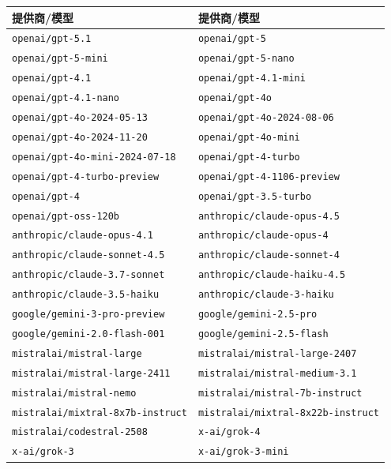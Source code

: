 \begin{table}[t]
\centering
\footnotesize
\begin{tabular}{ll}
\toprule
\textbf{提供商/模型} & \textbf{提供商/模型} \\
\midrule
\texttt{openai/gpt-5.1} & \texttt{openai/gpt-5} \\
\texttt{openai/gpt-5-mini} & \texttt{openai/gpt-5-nano} \\
\texttt{openai/gpt-4.1} & \texttt{openai/gpt-4.1-mini} \\
\texttt{openai/gpt-4.1-nano} & \texttt{openai/gpt-4o} \\
\texttt{openai/gpt-4o-2024-05-13} & \texttt{openai/gpt-4o-2024-08-06} \\
\texttt{openai/gpt-4o-2024-11-20} & \texttt{openai/gpt-4o-mini} \\
\texttt{openai/gpt-4o-mini-2024-07-18} & \texttt{openai/gpt-4-turbo} \\
\texttt{openai/gpt-4-turbo-preview} & \texttt{openai/gpt-4-1106-preview} \\
\texttt{openai/gpt-4} & \texttt{openai/gpt-3.5-turbo} \\
\texttt{openai/gpt-oss-120b} & \texttt{anthropic/claude-opus-4.5} \\
\texttt{anthropic/claude-opus-4.1} & \texttt{anthropic/claude-opus-4} \\
\texttt{anthropic/claude-sonnet-4.5} & \texttt{anthropic/claude-sonnet-4} \\
\texttt{anthropic/claude-3.7-sonnet} & \texttt{anthropic/claude-haiku-4.5} \\
\texttt{anthropic/claude-3.5-haiku} & \texttt{anthropic/claude-3-haiku} \\
\texttt{google/gemini-3-pro-preview} & \texttt{google/gemini-2.5-pro} \\
\texttt{google/gemini-2.0-flash-001} & \texttt{google/gemini-2.5-flash} \\
\texttt{mistralai/mistral-large} & \texttt{mistralai/mistral-large-2407} \\
\texttt{mistralai/mistral-large-2411} & \texttt{mistralai/mistral-medium-3.1} \\
\texttt{mistralai/mistral-nemo} & \texttt{mistralai/mistral-7b-instruct} \\
\texttt{mistralai/mixtral-8x7b-instruct} & \texttt{mistralai/mixtral-8x22b-instruct} \\
\texttt{mistralai/codestral-2508} & \texttt{x-ai/grok-4} \\
\texttt{x-ai/grok-3} & \texttt{x-ai/grok-3-mini} \\

\end{tabular}
\end{table}
